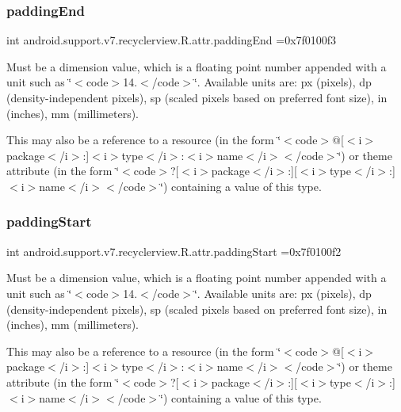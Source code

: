 \subsubsection{\texorpdfstring{padding\+End}{paddingEnd}}
{\footnotesize\ttfamily int android.\+support.\+v7.\+recyclerview.\+R.\+attr.\+padding\+End =0x7f0100f3\hspace{0.3cm}{\ttfamily [static]}}

Must be a dimension value, which is a floating point number appended with a unit such as \char`\"{}$<$code$>$14.\+5sp$<$/code$>$\char`\"{}. Available units are\+: px (pixels), dp (density-\/independent pixels), sp (scaled pixels based on preferred font size), in (inches), mm (millimeters). 

This may also be a reference to a resource (in the form \char`\"{}$<$code$>$@\mbox{[}$<$i$>$package$<$/i$>$\+:\mbox{]}$<$i$>$type$<$/i$>$\+:$<$i$>$name$<$/i$>$$<$/code$>$\char`\"{}) or theme attribute (in the form \char`\"{}$<$code$>$?\mbox{[}$<$i$>$package$<$/i$>$\+:\mbox{]}\mbox{[}$<$i$>$type$<$/i$>$\+:\mbox{]}$<$i$>$name$<$/i$>$$<$/code$>$\char`\"{}) containing a value of this type. \mbox{\label{classandroid_1_1support_1_1v7_1_1recyclerview_1_1R_1_1attr_ad30de1b7ee28e604be1e93448720355f}} 
\subsubsection{\texorpdfstring{padding\+Start}{paddingStart}}
{\footnotesize\ttfamily int android.\+support.\+v7.\+recyclerview.\+R.\+attr.\+padding\+Start =0x7f0100f2\hspace{0.3cm}{\ttfamily [static]}}

Must be a dimension value, which is a floating point number appended with a unit such as \char`\"{}$<$code$>$14.\+5sp$<$/code$>$\char`\"{}. Available units are\+: px (pixels), dp (density-\/independent pixels), sp (scaled pixels based on preferred font size), in (inches), mm (millimeters). 

This may also be a reference to a resource (in the form \char`\"{}$<$code$>$@\mbox{[}$<$i$>$package$<$/i$>$\+:\mbox{]}$<$i$>$type$<$/i$>$\+:$<$i$>$name$<$/i$>$$<$/code$>$\char`\"{}) or theme attribute (in the form \char`\"{}$<$code$>$?\mbox{[}$<$i$>$package$<$/i$>$\+:\mbox{]}\mbox{[}$<$i$>$type$<$/i$>$\+:\mbox{]}$<$i$>$name$<$/i$>$$<$/code$>$\char`\"{}) containing a value of this type. \mbox{\label{classandroid_1_1support_1_1v7_1_1recyclerview_1_1R_1_1attr_aa7e0d76fef1777b589738c359bb16900}} 
